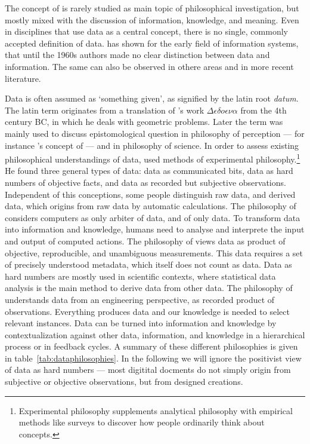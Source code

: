 The concept of  is rarely studied as main topic of philosophical
investigation, but mostly mixed with the discussion of information, knowledge, 
and meaning. Even in disciplines that use data as a central concept, there is 
no single, commonly accepted definition of data. \textcite{Gray2003} has shown 
for the early field of information systems, that until the 1960s authors made
no clear distinction between data and information. The same can also be 
observed in othere areas and in more recent literature.

Data is often assumed as `something given', as signified by the latin root
\emph{datum}. The latin term originates from a translation of 's
work $\Delta\epsilon\delta o\epsilon\nu\alpha$ from the 4th century BC, in
which he deals with geometric problems. Later the term was mainly used to
discuss epistomological question in philosophy of perception --- for instance
's concept of  --- and in philosophy
of science. In order to assess existing philosophical understandings of data,
\textcite{BallsunStanton2010,BallsunStanton2012} used methods of experimental
philosophy.\footnote{Experimental philosophy supplements analytical
philosophy with empirical methods like surveys to discover how people
ordinarily think about concepts.} He found three general types of data: data as
communicated bits, data as hard numbers of objective facts, and data as
recorded but subjective observations. Independent of this conceptions, some
people distinguish raw data, and derived data, which origins from raw data by
automatic calculations.  The philosophy of  considers
computers as only arbiter of data, and of only data. To transform data into
information and knowledge, humans need to analyse and interprete the input and
output of computed actions.  The philosophy of 
views data as product of objective, reproducible, and unambiguous measurements.
This data requires a set of precisely understood metadata, which itself does
not count as data. Data as hard numbers are mostly used in scientific contexts,
where statistical data analysis is the main method to derive data from other
data. The philosophy of  understands data
from an engineering perspective, as recorded product of observations.
Everything produces data and our knowledge is needed to select relevant
instances.  Data can be turned into information and knowledge by
contextualization against other data, information, and knowledge in a
hierarchical process or in feedback cycles. A summary of these different
philosophies is given in table~\ref{tab:dataphilosophies}. In the following we
will ignore the positivist view of data as hard numbers --- most digitital
docments do not simply origin from subjective or objective observations, but
from designed creations.

